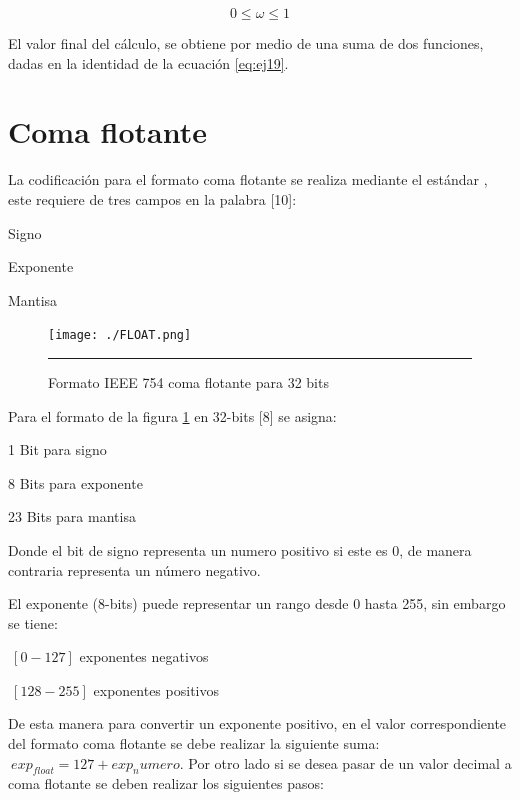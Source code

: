 \begin{equation} \label{eq:ej26}
   0 \leq \omega \leq 1
\end{equation}

El valor final del cálculo, se obtiene por medio de una suma de dos funciones, dadas en la identidad de la ecuación \ref{eq:ej19}. 

\section{Coma flotante}

La codificación para el formato coma flotante se realiza mediante el estándar , este requiere de tres campos en la palabra [10]: 

\begin{compactitem}
\item Signo 
\item Exponente
\item Mantisa 
\end{compactitem}

\begin{figure}[H]
  \centering
    \texttt{[image: ./FLOAT.png]}
    \rule{35em}{0.5pt}
  \caption[Formato IEEE 754 coma flotante para 32 bits]{Formato IEEE 754 coma flotante para 32 bits}
  \label{fig:FLOAT}
\end{figure}

Para el formato  de la figura \ref{fig:FLOAT} en 32-bits [8] se asigna: 

\begin{compactitem}
\item 1 Bit para signo 
\item 8 Bits para exponente
\item 23 Bits para mantisa 
\end{compactitem}

Donde el bit de signo representa un numero positivo si este es 0, de manera contraria representa un número negativo. 

El exponente (8-bits) puede representar un rango desde 0 hasta 255, sin embargo se tiene:

\begin{compactitem}
\item $\ \left[0-127\right]$ exponentes negativos  
\item $\ \left[128-255\right]$ exponentes positivos
\end{compactitem}

De esta manera para convertir un exponente positivo, en el valor correspondiente del formato coma flotante se debe realizar la siguiente suma: $\ exp_{float}=127+exp_numero $. Por otro lado si se desea pasar de un valor decimal a coma flotante se deben realizar los siguientes pasos: 

